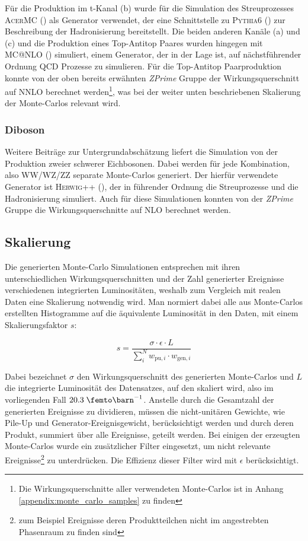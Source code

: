 Für die Produktion im t-Kanal (b) wurde für die Simulation des Streuprozesses
\textsc{AcerMC} (\cite{Kersevan:2004yg}) als Generator verwendet, der eine
Schnittstelle zu \textsc{Pythia6} (\cite{1126-6708-2006-05-026}) zur
Beschreibung der Hadronisierung bereitstellt. Die beiden anderen Kanäle (a) und
(c) und die Produktion eines Top-Antitop Paares wurden hingegen mit
\textsc{MC@NLO} (\cite{Frixione:2002ik}) simuliert, einem Generator, der in der
Lage ist, auf nächstführender Ordnung \ac{QCD} Prozesse zu simulieren. Für die
Top-Antitop Paarproduktion konnte von der oben bereits erwähnten
\textit{ZPrime} Gruppe der Wirkungsquerschnitt auf NNLO berechnet
werden\footnote{Die Wirkungsquerschnitte aller verwendeten Monte-Carlos ist in
Anhang \ref{appendix:monte_carlo_samples} zu finden}, was bei der weiter unten
beschriebenen Skalierung der Monte-Carlos relevant wird.

\subsubsection{Diboson}
Weitere Beiträge zur Untergrundabschätzung liefert die Simulation von der
Produktion zweier schwerer Eichbosonen. Dabei werden für jede Kombination, also
WW/WZ/ZZ separate Monte-Carlos generiert. Der hierfür verwendete Generator ist
\textsc{Herwig++} (\cite{Bahr:2008pv}), der in führender Ordnung die
Streuprozesse und die Hadronisierung simuliert. Auch für diese Simulationen
konnten von der \textit{ZPrime} Gruppe die Wirkungsquerschnitte auf NLO
berechnet werden.



\subsection{Skalierung}
Die generierten Monte-Carlo Simulationen entsprechen mit ihren
unterschiedlichen Wirkungsquerschnitten und der Zahl generierter Ereignisse
verschiedenen integrierten Luminositäten, weshalb zum Vergleich mit realen
Daten eine Skalierung notwendig wird. Man normiert dabei alle aus Monte-Carlos
erstellten Histogramme auf die äquivalente Luminosität in den Daten, mit einem
Skalierungsfaktor $s$:

\begin{equation}
    s = \frac{\sigma\cdot\epsilon\cdot L}{\sum_i^N w_{\text{pu},i}\cdot
    w_{\text{gen},i}}
    \label{eq:mc_scaling}
\end{equation}

Dabei bezeichnet $\sigma$ den Wirkungsquerschnitt des generierten Monte-Carlos
und $L$ die integrierte Luminosität des Datensatzes, auf den skaliert wird,
also im vorliegenden Fall $20.3 \fb^{-1}$. Anstelle durch die Gesamtzahl der
generierten Ereignisse zu dividieren, müssen die nicht-unitären Gewichte, wie
Pile-Up und Generator-Ereignisgewicht, berücksichtigt werden und durch deren
Produkt, summiert über alle Ereignisse, geteilt werden. Bei einigen der
erzeugten Monte-Carlos wurde ein zusätzlicher Filter eingesetzt, um nicht
relevante Ereignisse\footnote{zum Beispiel Ereignisse deren Produktteilchen
nicht im angestrebten Phasenraum zu finden sind} zu unterdrücken. Die Effizienz
dieser Filter wird mit $\epsilon$ berücksichtigt.


